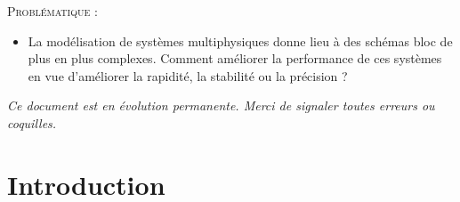 \documentclass[10pt,fleqn]{article} %
\begin{document}
\vspace{.2cm}

\begin{obj}
\textsc{Problématique :}
\begin{itemize}
\item La modélisation de systèmes multiphysiques donne lieu à des schémas bloc de plus en plus complexes. Comment améliorer la performance de ces systèmes en vue d'améliorer la rapidité, la stabilité ou la précision ?
\end{itemize}
\end{obj}


\setlength{\parskip}{0ex plus 0.2ex minus 0ex}
 \renewcommand{\contentsname}{}
 \renewcommand{\baselinestretch}{1}

\textit{Ce document est en évolution permanente. Merci de signaler toutes
erreurs ou coquilles.}

\tableofcontents

 \renewcommand{\baselinestretch}{1.2}
\setlength{\parskip}{2ex plus 0.5ex minus 0.2ex}

\section{Introduction}
\end{document}

